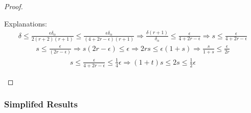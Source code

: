 \begin{proof}
\begin{boxedcomment}
Explanations:
\begin{align*}
\delta \le \frac{\epsilon\delta_{\alpha}}{2(r+2)(r + 1)}
\le \frac{\epsilon\delta_{\alpha}}{(4 + 2r - \epsilon)(r + 1)} 
\Longrightarrow \frac{\delta(r + 1)}{\delta_{\alpha}}  \le \frac{\epsilon}{4 + 2r - \epsilon} \Longrightarrow
s\le \frac{\epsilon}{4 + 2r - \epsilon}
\end{align*}
\begin{align*}
s\le \frac{\epsilon}{(2r - \epsilon)} \Longrightarrow
s(2r - \epsilon)\le \epsilon \Longrightarrow
2rs \le \epsilon(1 + s) \Longrightarrow
\frac {s}{1 + s} \le \frac {\epsilon} {2r}
\end{align*}
\begin{align*}
s \le \frac{\epsilon}{4 + 2r - \epsilon} \le \frac 1 4 \epsilon \Longrightarrow
(1 + t)s \le 2s \le \frac 1 2 \epsilon
\end{align*}
\end{boxedcomment}
\end{proof}

\subsubsection{Simplifed Results}
\label{simplifed_bounded_projection}







